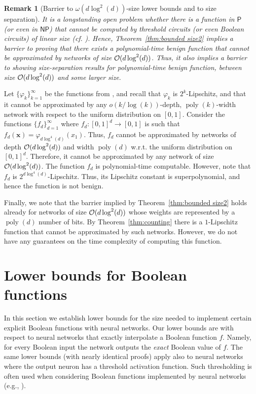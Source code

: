 \documentclass[11pt]{article}
\newtheorem{remark}{Remark}[section]
\newcommand{\bx}{\mathbf{x}}
\newcommand{\co}{{\cal O}}
\DeclareMathOperator{\poly}{poly}
\newcommand{\NP}{\textsf{NP}}
\newcommand{\Ptime}{\textsf{P}}
\begin{document}
\begin{remark}[Barrier to $\omega(d \log^2(d))$-size lower bounds and to size separation]
\label{rem:barrier to size separation}
	It is a longstanding open problem whether there is a function in $\Ptime$ (or even in $\NP$) that cannot be computed by threshold circuits (or even Boolean circuits) of linear size (cf. \cite{find2016better, arora2009computational}). Hence, Theorem~\ref{thm:bounded size2} implies a barrier to proving that there exists a polynomial-time benign function that cannot be approximated by networks of size $\co(d \log^2(d))$. 
	Thus, it also implies a barrier to showing size-separation results for polynomial-time benign function, between size $\co(d \log^2(d))$ and some larger size.
\end{remark}

Let $\{\varphi_k\}_{k=1}^\infty$ be the functions from  \cite{telgarsky2016benefits}, and recall that $\varphi_k$ is $2^k$-Lipschitz, and that it cannot be approximated by any $o(k/\log(k))$-depth, $\poly(k)$-width network with respect to the uniform distribution on $[0,1]$.
Consider the functions $\{f_d\}_{d=1}^\infty$ where $f_d:[0,1]^d \rightarrow [0,1]$ is such that $f_d(\bx) = \varphi_{d \log^4(d)}(x_1)$. Thus, $f_d$ cannot be approximated by networks of depth $\co(d \log^2(d))$ and width $\poly(d)$ w.r.t. the uniform distribution on $[0,1]^d$. Therefore, it cannot be approximated by any network of size $\co(d \log^2(d))$. 
The function $f_d$ is polynomial-time computable. 
However, note that $f_d$ is $2^{d \log^4(d)}$-Lipschitz. Thus, its Lipschitz constant is superpolynomial, and hence the function is not benign.

Finally, we note that the barrier implied by Theorem~\ref{thm:bounded size2} holds already for networks of size $\co(d \log^2(d))$ whose weights are represented by a $\poly(d)$ number of bits.
By Theorem~\ref{thm:counting} there is a $1$-Lipschitz function that cannot be approximated by such networks. However, we do not have any guarantees on the time complexity of computing this function.

\section{Lower bounds for Boolean functions}
\label{sec:boolean}

In this section we establish lower bounds for the size needed to implement certain explicit Boolean functions with neural networks. 
Our lower bounds are with respect to neural networks that exactly interpolate a Boolean function $f$. Namely, for every Boolean input the network outputs the \emph{exact} Boolean value of $f$. The same lower bounds (with nearly identical proofs) apply also to neural networks where the output neuron has a threshold activation function. Such thresholding is often used when considering Boolean functions implemented by neural networks  (e.g., \cite{mukherjee2017lower,martens2013representational,maass1997bounds,koiran1996vc,maass1991computational}).   
\end{document}
